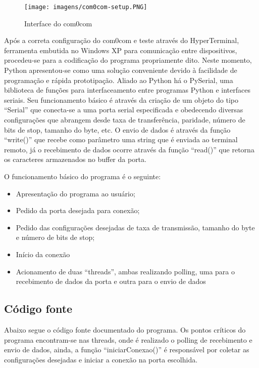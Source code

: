 \documentclass[brazil,times,12pt]{abnt}
\begin{document}
	\begin{figure}[htp]
	\begin{center}
  		\texttt{[image: imagens/com0com-setup.PNG]}
  		\caption[Interface do com0com]{Interface do com0com}
  	\label{fig:com0com}
	\end{center}
	\end{figure}
	
	Após a correta configuração do com0com e teste através do HyperTerminal,
	ferramenta embutida no Windows XP para comunicação entre dispositivos, 
	procedeu-se para a codificação do programa propriamente dito. Neste momento,
	Python apresentou-se como uma solução conveniente devido à facilidade de
	programação e rápida prototipação. Aliado ao Python há o PySerial, uma
	biblioteca de funções para interfaceamento entre programas Python e interfaces
	seriais. Seu funcionamento básico é através da criação de um objeto do tipo
	``Serial'' que conecta-se a uma porta serial especificada e obedecendo diversas
	configurações que abrangem desde taxa de transferência, paridade, número de
	bits de stop, tamanho do byte, etc. O envio de dados é através da função
	``write()'' que recebe como parâmetro uma string que é enviada ao terminal
	remoto, já o recebimento de dados ocorre através da função ``read()'' que
	retorna os caracteres armazenados no buffer da porta.
	
	O funcionamento básico do programa é o seguinte: 
	\begin{itemize}
  		\item Apresentação do programa ao usuário;
  		\item Pedido da porta desejada para conexão;
  		\item Pedido das configurações desejadas de taxa de transmissão, tamanho do
  		byte e número de bits de stop;
  		\item Início da conexão
  		\item Acionamento de duas ``threads'', ambas realizando polling, uma para o
  		recebimento de dados da porta e outra para o envio de dados
	\end{itemize}

	\subsection*{Código fonte}
	Abaixo segue o código fonte documentado do programa. Os pontos críticos do
	programa encontram-se nas threads, onde é realizado o polling de recebimento e
	envio de dados, ainda, a função ``iniciarConexao()'' é responsável por coletar
	as configurações desejadas e iniciar a conexão na porta escolhida.
	
\end{document}

